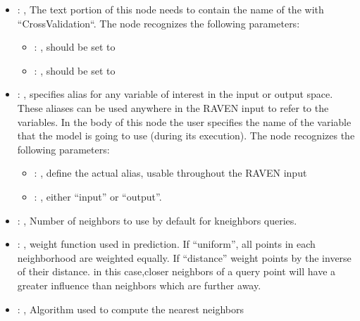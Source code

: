 \begin{itemize}
    \item {}: , 
      The text portion of this node needs to contain the name of the  with
               ``CrossValidation``.
      The  node recognizes the following parameters:
        \begin{itemize}
          \item {}: , 
            should be set to 
          \item {}: , 
            should be set to 
      \end{itemize}

    \item {}: , 
      specifies alias for         any variable of interest in the input or output space. These
      aliases can be used anywhere in the RAVEN input to         refer to the variables. In the body
      of this node the user specifies the name of the variable that the model is going to use
      (during its execution).
      The  node recognizes the following parameters:
        \begin{itemize}
          \item {}: , 
            define the actual alias, usable throughout the RAVEN input
          \item {}: , 
            either ``input'' or ``output''.
      \end{itemize}

    \item {}: , 
      Number of neighbors to use by default for kneighbors queries.

    \item {}: , 
      weight function used in prediction. If ``uniform'', all points in each neighborhood
      are weighted equally. If ``distance'' weight points by the inverse of their distance. in this
      case,closer neighbors of a query point will have a greater influence than neighbors which are
      further away.

    \item {}: , 
      Algorithm used to compute the nearest neighbors


\end{itemize}
